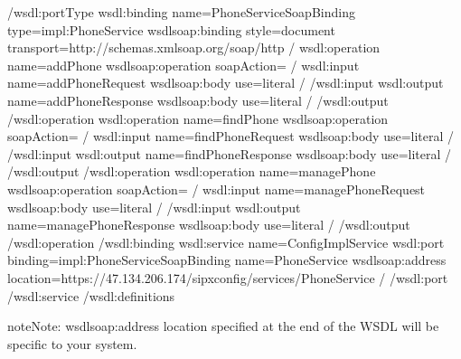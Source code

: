 \documentclass[letterpaper,10pt,english]{sphinxmanual}
\begin{document}
\begin{sphinxVerbatim}[commandchars=\\\{\}]
\PYGZlt{}/wsdl:portType\PYGZgt{}
\PYGZlt{}wsdl:binding name=\PYGZdq{}PhoneServiceSoapBinding\PYGZdq{} type=\PYGZdq{}impl:PhoneService\PYGZdq{}\PYGZgt{}
\PYGZlt{}wsdlsoap:binding style=\PYGZdq{}document\PYGZdq{} transport=\PYGZdq{}http://schemas.xmlsoap.org/soap/http\PYGZdq{} /\PYGZgt{}
\PYGZlt{}wsdl:operation name=\PYGZdq{}addPhone\PYGZdq{}\PYGZgt{}
\PYGZlt{}wsdlsoap:operation soapAction=\PYGZdq{}\PYGZdq{} /\PYGZgt{}
\PYGZlt{}wsdl:input name=\PYGZdq{}addPhoneRequest\PYGZdq{}\PYGZgt{}
\PYGZlt{}wsdlsoap:body use=\PYGZdq{}literal\PYGZdq{} /\PYGZgt{}
\PYGZlt{}/wsdl:input\PYGZgt{}
\PYGZlt{}wsdl:output name=\PYGZdq{}addPhoneResponse\PYGZdq{}\PYGZgt{}
\PYGZlt{}wsdlsoap:body use=\PYGZdq{}literal\PYGZdq{} /\PYGZgt{}
\PYGZlt{}/wsdl:output\PYGZgt{}
\PYGZlt{}/wsdl:operation\PYGZgt{}
\PYGZlt{}wsdl:operation name=\PYGZdq{}findPhone\PYGZdq{}\PYGZgt{}
\PYGZlt{}wsdlsoap:operation soapAction=\PYGZdq{}\PYGZdq{} /\PYGZgt{}
\PYGZlt{}wsdl:input name=\PYGZdq{}findPhoneRequest\PYGZdq{}\PYGZgt{}
\PYGZlt{}wsdlsoap:body use=\PYGZdq{}literal\PYGZdq{} /\PYGZgt{}
\PYGZlt{}/wsdl:input\PYGZgt{}
\PYGZlt{}wsdl:output name=\PYGZdq{}findPhoneResponse\PYGZdq{}\PYGZgt{}
\PYGZlt{}wsdlsoap:body use=\PYGZdq{}literal\PYGZdq{} /\PYGZgt{}
\PYGZlt{}/wsdl:output\PYGZgt{}
\PYGZlt{}/wsdl:operation\PYGZgt{}
\PYGZlt{}wsdl:operation name=\PYGZdq{}managePhone\PYGZdq{}\PYGZgt{}
\PYGZlt{}wsdlsoap:operation soapAction=\PYGZdq{}\PYGZdq{} /\PYGZgt{}
\PYGZlt{}wsdl:input name=\PYGZdq{}managePhoneRequest\PYGZdq{}\PYGZgt{}
\PYGZlt{}wsdlsoap:body use=\PYGZdq{}literal\PYGZdq{} /\PYGZgt{}
\PYGZlt{}/wsdl:input\PYGZgt{}
\PYGZlt{}wsdl:output name=\PYGZdq{}managePhoneResponse\PYGZdq{}\PYGZgt{}
\PYGZlt{}wsdlsoap:body use=\PYGZdq{}literal\PYGZdq{} /\PYGZgt{}
\PYGZlt{}/wsdl:output\PYGZgt{}
\PYGZlt{}/wsdl:operation\PYGZgt{}
\PYGZlt{}/wsdl:binding\PYGZgt{}
\PYGZlt{}wsdl:service name=\PYGZdq{}ConfigImplService\PYGZdq{}\PYGZgt{}
\PYGZlt{}wsdl:port binding=\PYGZdq{}impl:PhoneServiceSoapBinding\PYGZdq{} name=\PYGZdq{}PhoneService\PYGZdq{}\PYGZgt{}
\PYGZlt{}wsdlsoap:address location=\PYGZdq{}https://47.134.206.174/sipxconfig/services/PhoneService\PYGZdq{} /\PYGZgt{}
\PYGZlt{}/wsdl:port\PYGZgt{}
\PYGZlt{}/wsdl:service\PYGZgt{}
\PYGZlt{}/wsdl:definitions\PYGZgt{}
\end{sphinxVerbatim}

\begin{sphinxadmonition}{note}{Note:}
wsdlsoap:address location specified at the end of the WSDL will be specific to your system.
\end{sphinxadmonition}
\end{document}
